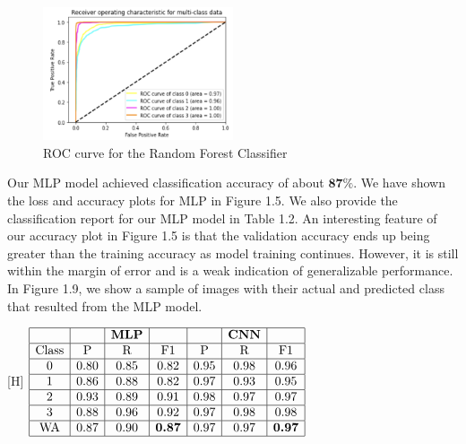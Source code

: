 \begin{figure}[H]
    \centering
    \includegraphics[width=0.5\textwidth]{Images/ROC-curve-rfc.png}
    \caption{ROC curve for the Random Forest Classifier}
\end{figure}

Our MLP model achieved classification accuracy of about $\mathbf{8 7 \%}$. We have shown the loss and accuracy plots for MLP in Figure 1.5. We also provide the classification report for our MLP model in Table 1.2. An interesting feature of our accuracy plot in Figure 1.5 is that the validation accuracy ends up being greater than the training accuracy as model training continues. However, it is still within the margin of error and is a weak indication of generalizable performance. In Figure 1.9, we show a sample of images with their actual and predicted class that resulted from the MLP model.


\begin{center}[H]
$\begin{array}{|c|c|c|c|c|c|c|}\hline&&\mathbf{MLP}&&&\mathbf{CNN}&\\\hline\text{Class}&\text{P}&\text{R}&\text{F1}&\text{P}&\text{R}&\text{F1}\\\hline0&0.80&0.85&0.82&0.95&0.98&0.96\\\hline1&0.86&0.88&0.82&0.97&0.93&0.95\\\hline2&0.93&0.89&0.91&0.98&0.97&0.97\\\hline3&0.88&0.96&0.92&0.97&0.98&0.98\\\hline\text{WA}&0.87&0.90&\textbf{0.87}&0.97&0.97&\textbf{0.97}\\\hline\end{array}$
\end{center} 

